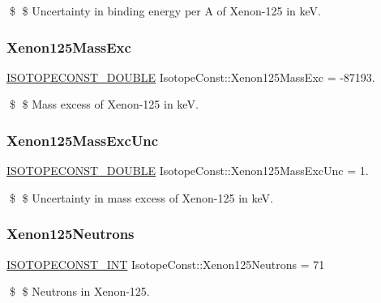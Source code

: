 \$ \$ Uncertainty in binding energy per A of Xenon-\/125 in keV. \mbox{\label{group___isotope_const-_xenon-_xe125_ga9e3700f89b7c75a09d960d47b2f7ab93}} 
\subsubsection{\texorpdfstring{Xenon125\+Mass\+Exc}{Xenon125MassExc}}
{\footnotesize\ttfamily \mbox{\hyperlink{group___isotope_const-_macros_ga8f45a7272ce02c0b4c65c44636ed719a}{I\+S\+O\+T\+O\+P\+E\+C\+O\+N\+S\+T\+\_\+\+D\+O\+U\+B\+LE}} Isotope\+Const\+::\+Xenon125\+Mass\+Exc = -\/87193.}

\$ \$ Mass excess of Xenon-\/125 in keV. \mbox{\label{group___isotope_const-_xenon-_xe125_gac2fbaeb0066c86b382324e0652318f40}} 
\subsubsection{\texorpdfstring{Xenon125\+Mass\+Exc\+Unc}{Xenon125MassExcUnc}}
{\footnotesize\ttfamily \mbox{\hyperlink{group___isotope_const-_macros_ga8f45a7272ce02c0b4c65c44636ed719a}{I\+S\+O\+T\+O\+P\+E\+C\+O\+N\+S\+T\+\_\+\+D\+O\+U\+B\+LE}} Isotope\+Const\+::\+Xenon125\+Mass\+Exc\+Unc = 1.}

\$ \$ Uncertainty in mass excess of Xenon-\/125 in keV. \mbox{\label{group___isotope_const-_xenon-_xe125_gaf18259d29b89bbf52aae7c227820bd68}} 
\subsubsection{\texorpdfstring{Xenon125\+Neutrons}{Xenon125Neutrons}}
{\footnotesize\ttfamily \mbox{\hyperlink{group___isotope_const-_macros_ga5f18360b3e99483a35c32d789e62621c}{I\+S\+O\+T\+O\+P\+E\+C\+O\+N\+S\+T\+\_\+\+I\+NT}} Isotope\+Const\+::\+Xenon125\+Neutrons = 71}

\$ \$ Neutrons in Xenon-\/125. \mbox{\label{group___isotope_const-_xenon-_xe125_ga985750bc11d721b474164554ad75b33d}} 
